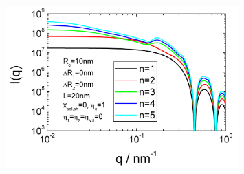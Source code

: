 \begin{figure}[htb]
\begin{center}
\includegraphics[width=0.8\textwidth]{../images/form_factor/cluster/DoubleShellChain.png}
\end{center}
\caption{}
\label{fig:DoubleShellChain}
\end{figure}




